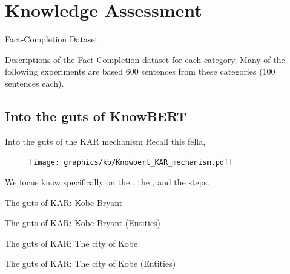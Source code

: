 \section{Knowledge Assessment}

\begin{frame}{Fact-Completion Dataset}


Descriptions of the Fact Completion dataset for each category. Many of the following experiments are based 600 sentences from these categories (100 sentences each).
\end{frame}

\subsection{Into the guts of KnowBERT}

\begin{frame}{Into the guts of the KAR mechanism}
Recall this fella,
\begin{figure}
    \centering
    \texttt{[image: graphics/kb/Knowbert\_KAR\_mechanism.pdf]}
\end{figure}
\pause
We focus know specifically on the , the , and the  steps.
\end{frame}

%     

\begin{frame}{The guts of KAR: Kobe Bryant}
\end{frame}
\begin{frame}{The guts of KAR: Kobe Bryant (Entities)}
    
\end{frame}


\begin{frame}{The guts of KAR: The city of Kobe}
\end{frame}
\begin{frame}{The guts of KAR: The city of Kobe (Entities)}
    \vspace{-0.15cm}
    
\end{frame}

